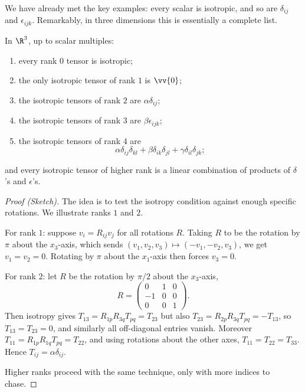We have already met the key examples: every scalar is isotropic, and so are $\delta_{ij}$ and $\epsilon_{ijk}$. Remarkably, in three dimensions this is essentially a complete list.

\begin{theorem}
	In $\R^3$, up to scalar multiples:
	\begin{enumerate}[label=(\roman*)]
		\item every rank $0$ tensor is isotropic;
		\item the only isotropic tensor of rank $1$ is $\vv{0}$;
		\item the isotropic tensors of rank $2$ are $\alpha \delta_{ij}$;
		\item the isotropic tensors of rank $3$ are $\beta \epsilon_{ijk}$;
		\item the isotropic tensors of rank $4$ are
		$$
		\alpha \delta_{ij}\delta_{kl} + \beta \delta_{ik}\delta_{jl} + \gamma \delta_{il}\delta_{jk};
		$$
	\end{enumerate}
	and every isotropic tensor of higher rank is a linear combination of products of $\delta$'s and $\epsilon$'s.
\end{theorem}
\begin{proof}[Proof (Sketch)]
	The idea is to test the isotropy condition against enough specific rotations. We illustrate ranks $1$ and $2$.

	For rank $1$: suppose $v_i = R_{ij}v_j$ for all rotations $R$. Taking $R$ to be the rotation by $\pi$ about the $x_3$-axis, which sends $(v_1, v_2, v_3) \mapsto (-v_1, -v_2, v_3)$, we get $v_1 = v_2 = 0$. Rotating by $\pi$ about the $x_1$-axis then forces $v_3 = 0$.

	For rank $2$: let $R$ be the rotation by $\pi/2$ about the $x_3$-axis,
	$$
	R = \begin{pmatrix}
		0 & 1 & 0 \\
		-1 & 0 & 0 \\
		0 & 0 & 1
	\end{pmatrix}.
	$$
	Then isotropy gives $T_{13} = R_{1p}R_{3q}T_{pq} = T_{23}$ but also $T_{23} = R_{2p}R_{3q}T_{pq} = -T_{13}$, so $T_{13} = T_{23} = 0$, and similarly all off-diagonal entries vanish. Moreover $T_{11} = R_{1p}R_{1q}T_{pq} = T_{22}$, and using rotations about the other axes, $T_{11} = T_{22} = T_{33}$. Hence $T_{ij} = \alpha \delta_{ij}$.

	Higher ranks proceed with the same technique, only with more indices to chase.
\end{proof}

